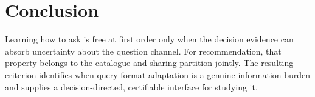\documentclass[sigconf,anonymous,review]{acmart}
\begin{document}
\section{Conclusion}
Learning how to ask is free at first order only when the decision evidence can absorb uncertainty about the question channel. For recommendation, that property belongs to the catalogue and sharing partition jointly. The resulting criterion identifies when query-format adaptation is a genuine information burden and supplies a decision-directed, certifiable interface for studying it.


\end{document}
